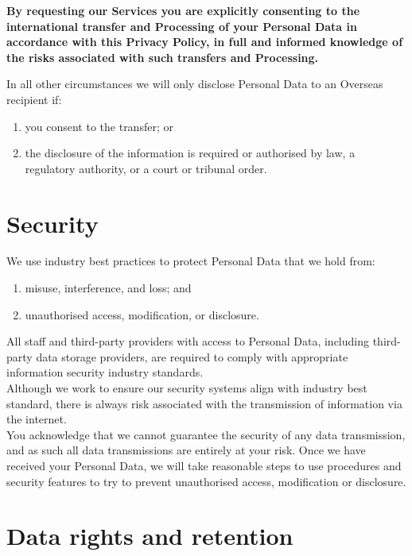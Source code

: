 \documentclass[10pt]{article}
\begin{document}
\begin{mdframed}[leftmargin=10pt,rightmargin=10pt]
\textbf{By requesting our Services you are explicitly consenting to the international transfer and Processing of your Personal Data in accordance with this Privacy Policy, in full and informed knowledge of the risks associated with such transfers and Processing.}
\end{mdframed}


In all other circumstances we will only disclose Personal Data to an Overseas recipient if:
\begin{enumerate}[(1)]
	\item you consent to the transfer; or

	\item the disclosure of the information is required or authorised by law, a regulatory authority, or a court or tribunal order.
\end{enumerate}


\section{Security}
We use industry best practices to protect Personal Data that we hold from:
\begin{enumerate}[(1)]
	\item misuse, interference, and loss; and

	\item unauthorised access, modification, or disclosure.
\end{enumerate}

All staff and third-party providers with access to Personal Data, including third-party data storage providers, are required to comply with appropriate information security industry standards. \\

Although we work to ensure our security systems align with industry best standard, there is always risk associated with the transmission of information via the internet. \\

You acknowledge that we cannot guarantee the security of any data transmission, and as such all data transmissions are entirely at your risk. Once we have received your Personal Data, we will take reasonable steps to use procedures and security features to try to prevent unauthorised access, modification or disclosure.


\section{Data rights and retention}
\end{document}
